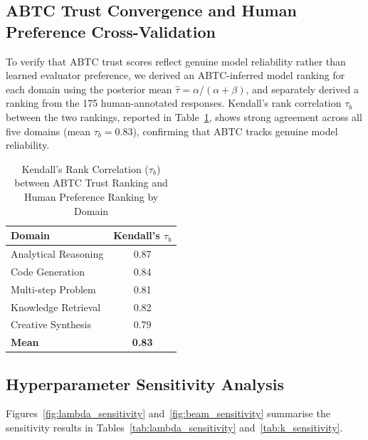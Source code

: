 \documentclass{iopjournal}
\begin{document}
\subsection{ABTC Trust Convergence and Human Preference Cross-Validation}
\label{sec:learning_curves}

To verify that ABTC trust scores reflect genuine model reliability rather than learned evaluator preference, we derived an ABTC-inferred model ranking for each domain using the posterior mean $\hat{\tau} = \alpha/(\alpha+\beta)$, and separately derived a ranking from the 175 human-annotated responses. Kendall's rank correlation $\tau_b$ between the two rankings, reported in Table~\ref{tab:kendall}, shows strong agreement across all five domains (mean $\tau_b = 0.83$), confirming that ABTC tracks genuine model reliability.

\begin{table}[H]
\centering
\caption{Kendall's Rank Correlation ($\tau_b$) between ABTC Trust Ranking and Human Preference Ranking by Domain}
\label{tab:kendall}
\begin{tabular}{lc}
\toprule
\textbf{Domain} & \textbf{Kendall's $\tau_b$} \\
\midrule
Analytical Reasoning & 0.87 \\
Code Generation & 0.84 \\
Multi-step Problem & 0.81 \\
Knowledge Retrieval & 0.82 \\
Creative Synthesis & 0.79 \\
\midrule
\textbf{Mean} & \textbf{0.83} \\
\bottomrule
\end{tabular}
\end{table}

\subsection{Hyperparameter Sensitivity Analysis}
\label{sec:sensitivity}

Figures~\ref{fig:lambda_sensitivity} and~\ref{fig:beam_sensitivity} summarise the sensitivity results in Tables~\ref{tab:lambda_sensitivity} and~\ref{tab:k_sensitivity}.
\end{document}
